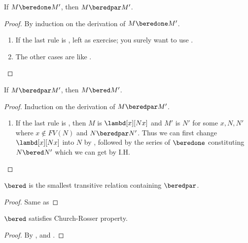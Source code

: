 \documentclass[../../../include/open-logic-section]{subfiles}
\begin{document}


\begin{lem}
  If $M \beredone M'$, then $M \beredpar M'$.
\end{lem}
\begin{proof} By induction on the derivation of $M \beredone M'$.
  \begin{enumerate}
  \item If the last rule is , left as exercise;
    you surely want to use .
  \item The other cases are like .
  \end{enumerate}
\end{proof}

\begin{lem}
  If $M \beredpar M'$, then $M \bered M'$.
\end{lem}
\begin{proof} Induction on the derivation of $M \beredpar M'$.
  \begin{enumerate}
    \item If the last rule is , then $M$ is
      $\lambd[x][Nx]$ and $M'$ is $N'$ for some $x, N, N'$ where $x
      \notin FV(N)$ and $N \beredpar N'$. Thus we can first change
      $\lambd[x][Nx]$ into $N$ by , followed by
      the series of $\beredone$ constituting $N \bered N'$ which we
      can get by I.H.
  \end{enumerate}
\end{proof}


\begin{lem}
  $\bered$ is the smallest transitive relation containing $\beredpar$.
\end{lem}
\begin{proof}
  Same as 
\end{proof}

\begin{thm}
  $\bered$ satisfies Church-Rosser property.
\end{thm}
\begin{proof}
  By ,  and .
\end{proof}
\end{document}
